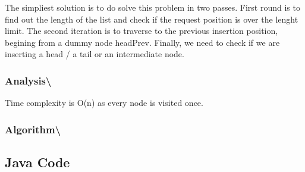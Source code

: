 \documentclass[]{book}
\begin{document}
The simpliest solution is to do solve this problem in two passes. First round is to find out the length of the list and
check if the request position is over the lenght limit. The second iteration is to traverse to the previous insertion
position, begining from a dummy node headPrev. Finally, we need to check if we are inserting a head / a tail or an
intermediate node.

\hypertarget{analysis-122}{%
\subsubsection{Analysis\textbackslash{}}\label{analysis-122}}

Time complexity is O(n) as every node is visited once.

\hypertarget{algorithm-127}{%
\subsubsection{Algorithm\textbackslash{}}\label{algorithm-127}}

\hypertarget{java-code-75}{%
\subsection{Java Code}\label{java-code-75}}
\end{document}
